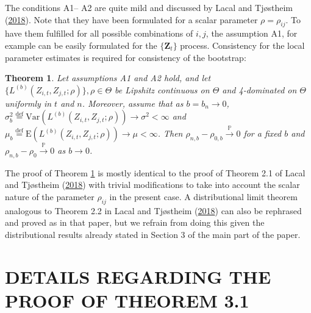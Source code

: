 \documentclass[
  12pt,
  letterpaper]{article}
\newtheorem{thm}{Theorem}[section]
\numberwithin{equation}{section}
\newcommand{\Z}{\bm{Z}}
\newcommand{\E}{\textrm{E}}
\newcommand{\Var}{\textrm{Var}}
\begin{document}
The conditions A1-- A2 are quite mild and discussed by Lacal and Tjøstheim (\protect\hyperlink{ref-lacal2018estimating}{2018}). Note that they have been formulated for a scalar parameter \(\rho = \rho_{ij}\). To have them fulfilled for all possible combinations of \(i,j\), the assumption A1, for example can be easily formulated for the \(\{\Z_t\}\) process. Consistency for the local parameter estimates is required for consistency of the bootstrap:

\begin{thm} Let assumptions A1 and A2 hold, and let $\{L^{(b)}(Z_{i,t}, Z_{j,t};\rho)\}, \rho \in \Theta$ be Lipshitz continuous on $\Theta$ and 4-dominated on $\Theta$ uniformly in $t$ and $n$. Moreover, assume that as $b=b_n\rightarrow 0$, $\sigma^2_b \stackrel{\textrm{def}}{=} \Var\left(L^{(b)}(Z_{i,t}, Z_{j,t};\rho)\right) \rightarrow \sigma^2 < \infty$ and $\mu_b \stackrel{\textrm{def}}{=} \E\left(L^{(b)}(Z_{i,t}, Z_{j,t};\rho)\right) \rightarrow \mu < \infty$. Then $\rho_{n,b} - \rho_{0,b} \stackrel{\mathbb{P}}{\rightarrow} 0$ for a fixed $b$ and $\rho_{n,b} - \rho_{0} \stackrel{\mathbb{P}}{\rightarrow} 0$ as $b \rightarrow 0$.
\label{thm:A1}
\end{thm}

The proof of Theorem \ref{thm:A1} is mostly identical to the proof of Theorem 2.1 of Lacal and Tjøstheim (\protect\hyperlink{ref-lacal2018estimating}{2018}) with trivial modifications to take into account the scalar nature of the parameter \(\rho_{ij}\) in the present case. A distributional limit theorem analogous to Theorem 2.2 in Lacal and Tjøstheim (\protect\hyperlink{ref-lacal2018estimating}{2018}) can also be rephrased and proved as in that paper, but we refrain from doing this given the distributional results already stated in Section 3 of the main part of the paper.

\hypertarget{app-loccor}{%
\section{DETAILS REGARDING THE PROOF OF THEOREM 3.1}\label{app-loccor}}
\end{document}
